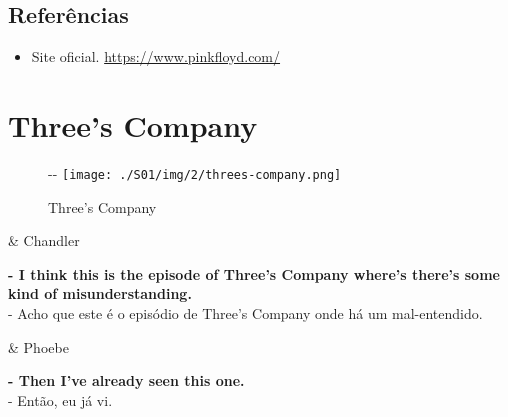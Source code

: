 \hypertarget{referuxeancias}{%
\subsection{Referências}\label{referuxeancias}}

\begin{itemize}
\tightlist
\item
  \sloppy Site oficial. \url{https://www.pinkfloyd.com/}
\end{itemize}

\hypertarget{threes-company}{%
\section{Three's Company}\label{threes-company}}

\begin{figure}[!ht]
  \begin{adjustwidth}{-\oddsidemargin-1in}{-\rightmargin}
    \centering
    \texttt{[image: ./S01/img/2/threes-company.png]}
    \caption{Three’s Company\label{fig:three-s-company}}
  \end{adjustwidth}
\end{figure}

\begin{tcolorbox}[enhanced,center upper,
    drop fuzzy shadow southeast, boxrule=0.3pt,
    lower separated=false,
    colframe=black!30!dialogoBorder,colback=white]
\begin{minipage}[c]{0.14\linewidth}
   & \centering \scriptsize{Chandler}
\end{minipage}
\hspace{.1mm}
\begin{minipage}[c]{0.8\linewidth}
  \textbf{- I think this is the episode of Three's Company where's there's some kind of misunderstanding.}\\
  - Acho que este é o episódio de Three's Company onde há um mal-entendido.
\end{minipage}

\medskip
\begin{minipage}[c]{0.14\linewidth}
   & \centering \scriptsize{Phoebe}
\end{minipage}
\hspace{.1mm}
\begin{minipage}[c]{0.8\linewidth}
  \textbf{- Then I've already seen this one.}\\
  - Então, eu já vi.
\end{minipage}
\end{tcolorbox}

